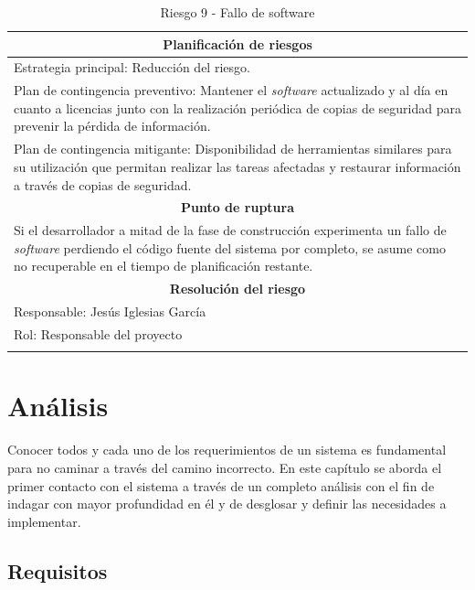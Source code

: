 \documentclass[12pt,a4paper, twoside]{report}
\begin{document}
\begin{longtable}{m{4cm}|m{5cm}|m{4cm}}
		\multicolumn{3}{|c|}{\textbf{Planificación de riesgos}} \\ \hline \hline
		\multicolumn{3}{|p{17cm}|}{Estrategia principal: Reducción del riesgo.} \\ \hline
		\multicolumn{3}{|p{17cm}|}{Plan de contingencia preventivo: Mantener el \textit{software} actualizado y al día en cuanto a licencias junto con la realización periódica de copias de seguridad para prevenir la pérdida de información.} \\ \hline
		\multicolumn{3}{|p{17cm}|}{Plan de contingencia mitigante: Disponibilidad de herramientas similares para su utilización que permitan realizar las tareas afectadas y restaurar información a través de copias de seguridad.} \\ \hline
			
		\multicolumn{3}{|c|}{\textbf{Punto de ruptura}} \\ \hline \hline
		\multicolumn{3}{|p{17cm}|}{Si el desarrollador a mitad de la fase de construcción experimenta un fallo de \textit{software} perdiendo el código fuente del sistema por completo, se asume como no recuperable en el tiempo de planificación restante.}\\ \hline
			
		\multicolumn{3}{|c|}{\textbf{Resolución del riesgo}} \\ \hline \hline
		\multicolumn{3}{|p{17cm}|}{Responsable: Jesús Iglesias García}\\ \hline
		\multicolumn{3}{|p{17cm}|}{Rol: Responsable del proyecto} \\ \hline
		\caption{Riesgo 9 - Fallo de software}	
	\end{longtable}
			
	\chapter{Análisis} \label{analysisChapter}
	
	Conocer todos y cada uno de los requerimientos de un sistema es fundamental para no caminar a través del camino incorrecto. En este capítulo se aborda el primer contacto con el sistema a través de un completo análisis con el fin de indagar con mayor profundidad en él y de desglosar y definir las necesidades a implementar.

	\section{Requisitos}
\end{document}
